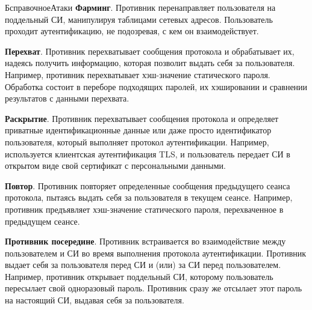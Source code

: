 \begin{appendix}{Б}{справочное}{Атаки}
{\bf Фарминг}. 
Противник перенаправляет пользователя на поддельный СИ,
манипулируя таблицами сетевых адресов.
Пользователь проходит аутентификацию, не подозревая,
с кем он взаимодействует.


{\bf Перехват}. 
Противник перехватывает сообщения протокола и обрабатывает их,
надеясь получить информацию, которая позволит выдать себя за пользователя. 
Например, противник перехватывает хэш-значение статического пароля.
Обработка состоит в переборе подходящих паролей, их хэшировании и 
сравнении результатов с данными перехвата. 


{\bf Раскрытие}. 
Противник перехватывает сообщения протокола и 
определяет приватные идентификационные данные или даже просто 
идентификатор пользователя, который выполняет протокол аутентификации.
% 
Например, используется клиентская аутентификация TLS, 
и пользователь передает СИ в открытом виде
свой сертификат с персональными данными.


{\bf Повтор}. 
Противник повторяет определенные сообщения предыдущего сеанса протокола,
пытаясь выдать себя за пользователя в текущем сеансе. 
%
Например, противник предъявляет хэш-значение статического пароля,
перехваченное в предыдущем сеансе.


{\bf Противник посередине}. 
Противник встраивается во взаимодействие между пользователем и СИ во время
выполнения протокола аутентификации. Противник выдает себя 
за пользователя перед СИ и (или) за СИ перед пользователем. 
Например, противник открывает поддельный СИ, которому пользователь 
пересылает свой одноразовый пароль. Противник сразу же отсылает
этот пароль на настоящий СИ, выдавая себя за пользователя.



\end{appendix}
